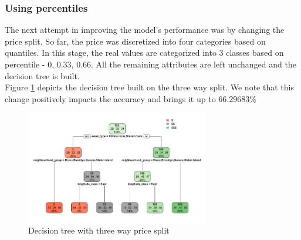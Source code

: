 \documentclass{sig-alternate}
\begin{document}
	\subsubsection{Using percentiles}
	The next attempt in improving the model's performance was by changing the price split. So far, the price was discretized into four categories based on quantiles. In this stage, the real values are categorized into 3 classes based on percentile - 0, 0.33, 0.66. All the remaining attributes are left unchanged and the decision tree is built.\\
	Figure \ref{decision4} depicts the decision tree built on the three way split. We note that this change positively impacts the accuracy and brings it up to 66.29683\%
	\begin{figure}[ht]
		\includegraphics[width=8cm]{decision4.PNG}
		\caption{Decision tree with three way price split}
		\label{decision4}
		\centering
	\end{figure}
\end{document}
